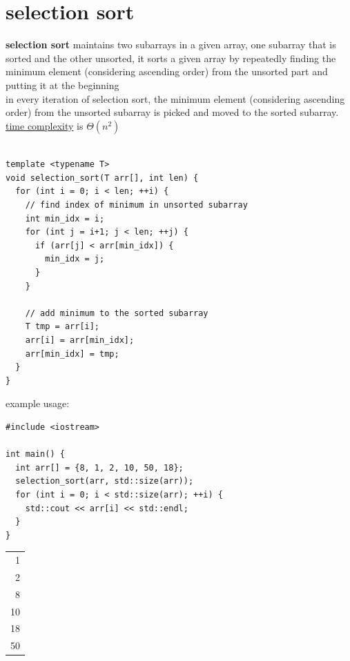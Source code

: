 \documentclass[a4paper,12pt]{article}
\begin{document}
\section{selection sort}
\label{sec:org3d2b10f}
\textbf{selection sort} maintains two subarrays in a given array, one subarray that is sorted and the other unsorted, it sorts a given array by repeatedly finding the minimum element (considering ascending order) from the unsorted part and putting it at the beginning\\
in every iteration of selection sort, the minimum element (considering ascending order) from the unsorted subarray is picked and moved to the sorted subarray.\\
\href{20221130014441-time_complexity.org}{time complexity} is \(\Theta(n^2)\)\\

\\

\lstset{language=C++,label=orgb346e4d,caption= ,captionpos=b,numbers=none}
\begin{lstlisting}
template <typename T>
void selection_sort(T arr[], int len) {
  for (int i = 0; i < len; ++i) {
    // find index of minimum in unsorted subarray
    int min_idx = i;
    for (int j = i+1; j < len; ++j) {
      if (arr[j] < arr[min_idx]) {
        min_idx = j;
      }
    }

    // add minimum to the sorted subarray
    T tmp = arr[i];
    arr[i] = arr[min_idx];
    arr[min_idx] = tmp;
  }
}
\end{lstlisting}

example usage:\\

\lstset{language=C++,label= ,caption= ,captionpos=b,numbers=none}
\begin{lstlisting}
#include <iostream>

int main() {
  int arr[] = {8, 1, 2, 10, 50, 18};
  selection_sort(arr, std::size(arr));
  for (int i = 0; i < std::size(arr); ++i) {
    std::cout << arr[i] << std::endl;
  }
}
\end{lstlisting}

\begin{tabular}{r}
1\\
2\\
8\\
10\\
18\\
50\\
\end{tabular}
\end{document}
